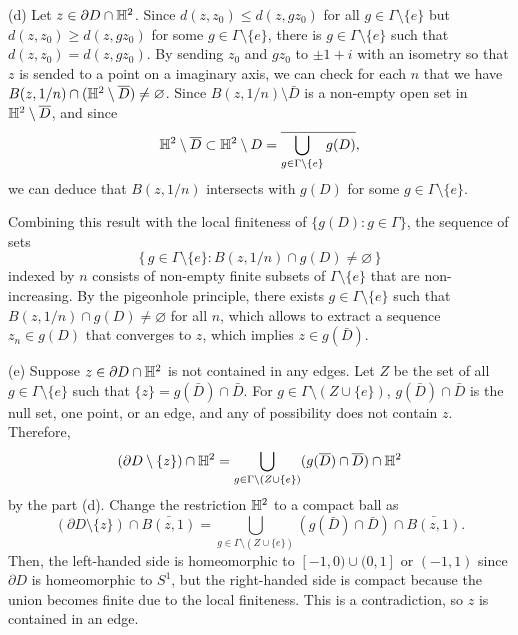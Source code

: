 \documentclass[a4paper]{article}
\begin{document}
\begin{pf}
(d)
Let $z\in\partial D\cap\mathbb{H}^2$.
Since $d(z,z_0)\le d(z,gz_0)$ for all $g\in\Gamma\setminus\{e\}$ but $d(z,z_0)\ge d(z,gz_0)$ for some $g\in\Gamma\setminus\{e\}$, there is $g\in\Gamma\setminus\{e\}$ such that $d(z,z_0)=d(z,gz_0)$.
By sending $z_0$ and $gz_0$ to $\pm1+i$ with an isometry so that $z$ is sended to a point on a imaginary axis, we can check for each $n$ that we have $B(z,1/n)\cap(\mathbb{H}^2\setminus\overline D)\ne\varnothing$.
Since $B(z,1/n)\setminus\bar D$ is a non-empty open set in $\mathbb{H}^2\setminus\overline D$, and since
\[\mathbb{H}^2\setminus\overline D\subset\mathbb{H}^2\setminus D=\overline{\bigcup_{g\in\Gamma\setminus\{e\}}g(D)},\]
we can deduce that $B(z,1/n)$ intersects with $g(D)$ for some $g\in\Gamma\setminus\{e\}$.

Combining this result with the local finiteness of $\{g(D):g\in\Gamma\}$, the sequence of sets
\[\{\,g\in\Gamma\setminus\{e\}:B(z,1/n)\cap g(D)\ne\varnothing\,\}\]
indexed by $n$ consists of non-empty finite subsets of $\Gamma\setminus\{e\}$ that are non-increasing.
By the pigeonhole principle, there exists $g\in\Gamma\setminus\{e\}$ such that $B(z,1/n)\cap g(D)\ne\varnothing$ for all $n$, which allows to extract a sequence $z_n\in g(D)$ that converges to $z$, which implies $z\in g(\bar D)$.

(e)
Suppose $z\in\partial D\cap\mathbb{H}^2$ is not contained in any edges.
Let $Z$ be the set of all $g\in\Gamma\setminus\{e\}$ such that $\{z\}=g(\bar D)\cap\bar D$.
For $g\in\Gamma\setminus(Z\cup\{e\})$, $g(\bar D)\cap\bar D$ is the null set, one point, or an edge, and any of possibility does not contain $z$.
Therefore,
\[(\partial D\setminus\{z\})\cap\mathbb{H}^2=\bigcup_{g\in\Gamma\setminus(Z\cup\{e\})}(g(\overline D)\cap\overline D)\cap\mathbb{H}^2\]
by the part (d).
Change the restriction $\mathbb{H}^2$ to a compact ball as
\[(\partial D\setminus\{z\})\cap\bar{B(z,1)}=\bigcup_{g\in\Gamma\setminus(Z\cup\{e\})}(g(\bar D)\cap\bar D)\cap\bar{B(z,1)}.\]
Then, the left-handed side is homeomorphic to $[-1,0)\cup(0,1]$ or $(-1,1)$ since $\partial D$ is homeomorphic to $S^1$, but the right-handed side is compact because the union becomes finite due to the local finiteness.
This is a contradiction, so $z$ is contained in an edge.
\end{pf}
\fi
\end{document}
